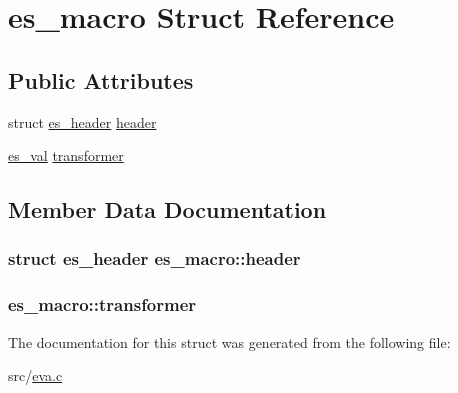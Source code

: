 \hypertarget{structes__macro}{\section{es\-\_\-macro Struct Reference}
\label{structes__macro}
}
\subsection*{Public Attributes}
\begin{DoxyCompactItemize}
\item 
struct \hyperlink{structes__header}{es\-\_\-header} \hyperlink{structes__macro_abab0c9da146d30e739eb663e21233d9f}{header}
\item 
\hyperlink{eva_8h_a8333c63b2093a13aab6d419c87680d7f}{es\-\_\-val} \hyperlink{structes__macro_a0559820759ca866be6b0ceb05a63ec1f}{transformer}
\end{DoxyCompactItemize}


\subsection{Member Data Documentation}
\hypertarget{structes__macro_abab0c9da146d30e739eb663e21233d9f}{
\subsubsection[{header}]{\setlength{\rightskip}{0pt plus 5cm}struct {\bf es\-\_\-header} es\-\_\-macro\-::header}}\label{structes__macro_abab0c9da146d30e739eb663e21233d9f}
\hypertarget{structes__macro_a0559820759ca866be6b0ceb05a63ec1f}{
\subsubsection[{transformer}]{ es\-\_\-macro\-::transformer}}\label{structes__macro_a0559820759ca866be6b0ceb05a63ec1f}


The documentation for this struct was generated from the following file\-:\begin{DoxyCompactItemize}
\item 
src/\hyperlink{eva_8c}{eva.\-c}\end{DoxyCompactItemize}
